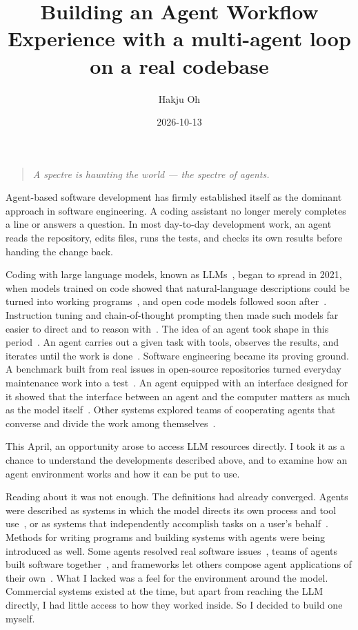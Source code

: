 \documentclass[11pt,a4paper]{article}
\title{Building an Agent Workflow\\ Experience with a multi-agent loop on a real codebase}
\author{Hakju Oh}
\date{2026-10-13}
\newenvironment{epigraph}
  {\begin{quote}\itshape}
  {\end{quote}}
\begin{document}
\maketitle

\begin{epigraph}
A spectre is haunting the world --- the spectre of agents.
\end{epigraph}

Agent-based software development has firmly established itself as the dominant approach in
software engineering.
A coding assistant no longer merely completes a line or answers a question.
In most day-to-day development work, an agent reads the repository, edits files, runs the tests,
and checks its own results before handing the change back.

Coding with large language models, known as LLMs~\cite{brown2020gpt3}, began to spread in 2021, when
models trained on code showed that natural-language descriptions could be turned into
working programs~\cite{chen2021codex,austin2021program,li2022alphacode},
and open code models followed soon after~\cite{nijkamp2023codegen,roziere2023codellama}.
Instruction tuning and chain-of-thought prompting then made such models far easier to direct
and to reason with~\cite{ouyang2022instructgpt,wei2022cot}.
The idea of an agent took shape in this period~\cite{yao2023react,schick2023toolformer,shinn2023reflexion}.
An agent carries out a given task with tools, observes the results, and iterates until the
work is done~\cite{wang2023survey,xi2023rise}.
Software engineering became its proving ground.
A benchmark built from real issues in open-source repositories turned everyday maintenance
work into a test~\cite{jimenez2024swebench}.
An agent equipped with an interface designed for it showed that the interface between an
agent and the computer matters as much as the model itself~\cite{yang2024sweagent}.
Other systems explored teams of cooperating agents that converse and divide the work among
themselves~\cite{qian2024chatdev,hong2023metagpt,wu2023autogen}.

This April, an opportunity arose to access LLM resources directly.
I took it as a chance to understand the developments described above, and to examine how an
agent environment works and how it can be put to use.

Reading about it was not enough.
The definitions had already converged.
Agents were described as systems in which the model directs its own process and tool
use~\cite{anthropic2024building}, or as systems that independently accomplish tasks on a
user's behalf~\cite{openai2025practical}.
Methods for writing programs and building systems with agents were being introduced as well.
Some agents resolved real software issues~\cite{yang2024sweagent}, teams of agents built
software together~\cite{qian2024chatdev,hong2023metagpt}, and frameworks let others compose
agent applications of their own~\cite{wu2023autogen}.
What I lacked was a feel for the environment around the model.
Commercial systems existed at the time, but apart from reaching the LLM directly, I had little
access to how they worked inside.
So I decided to build one myself.
\end{document}
